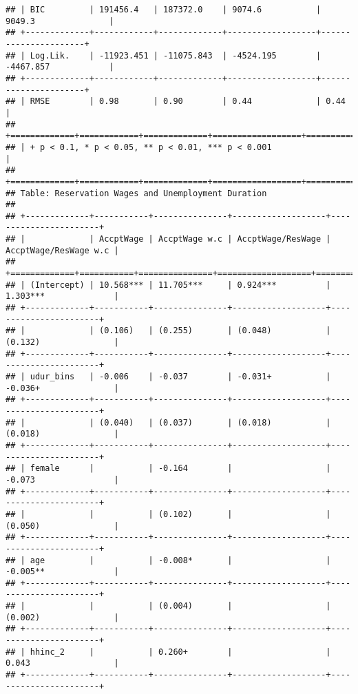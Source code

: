 \begin{verbatim}
## | BIC         | 191456.4   | 187372.0    | 9074.6           | 9049.3               |
## +-------------+------------+-------------+------------------+----------------------+
## | Log.Lik.    | -11923.451 | -11075.843  | -4524.195        | -4467.857            |
## +-------------+------------+-------------+------------------+----------------------+
## | RMSE        | 0.98       | 0.90        | 0.44             | 0.44                 |
## +=============+============+=============+==================+======================+
## | + p < 0.1, * p < 0.05, ** p < 0.01, *** p < 0.001                                |
## +=============+============+=============+==================+======================+
## Table: Reservation Wages and Unemployment Duration 
## 
## +-------------+-----------+---------------+-------------------+-----------------------+
## |             | AccptWage | AccptWage w.c | AccptWage/ResWage | AccptWage/ResWage w.c |
## +=============+===========+===============+===================+=======================+
## | (Intercept) | 10.568*** | 11.705***     | 0.924***          | 1.303***              |
## +-------------+-----------+---------------+-------------------+-----------------------+
## |             | (0.106)   | (0.255)       | (0.048)           | (0.132)               |
## +-------------+-----------+---------------+-------------------+-----------------------+
## | udur_bins   | -0.006    | -0.037        | -0.031+           | -0.036+               |
## +-------------+-----------+---------------+-------------------+-----------------------+
## |             | (0.040)   | (0.037)       | (0.018)           | (0.018)               |
## +-------------+-----------+---------------+-------------------+-----------------------+
## | female      |           | -0.164        |                   | -0.073                |
## +-------------+-----------+---------------+-------------------+-----------------------+
## |             |           | (0.102)       |                   | (0.050)               |
## +-------------+-----------+---------------+-------------------+-----------------------+
## | age         |           | -0.008*       |                   | -0.005**              |
## +-------------+-----------+---------------+-------------------+-----------------------+
## |             |           | (0.004)       |                   | (0.002)               |
## +-------------+-----------+---------------+-------------------+-----------------------+
## | hhinc_2     |           | 0.260+        |                   | 0.043                 |
## +-------------+-----------+---------------+-------------------+-----------------------+

\end{verbatim}

